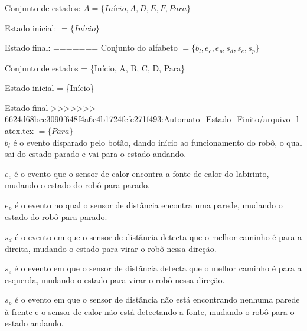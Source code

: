 \documentclass{report}
\begin{document}
Conjunto de estados:
$A = \{Início, A, D, E, F, Para\}$

Estado inicial:
$= \{Início\}$

Estado final:
=======
Conjunto do alfabeto
$= \{b_l, e_c, e_p, s_d, s_e, s_p\}$

Conjunto de estados
= \{Início, A, B, C, D, Para\}

Estado inicial
= \{Início\}

Estado final
>>>>>>> 6624d68bcc3090f648f4a6e4b1724fefc271f493:Automato_Estado_Finito/arquivo_latex.tex
$= \{Para\}$\\


$b_l$ é o evento disparado pelo botão, dando início ao funcionamento do robô, o qual sai do estado parado e vai para o estado andando.

$e_c$ é o evento que o sensor de calor encontra a fonte de calor do labirinto, mudando o estado do robô para parado.

$e_p$ é o evento no qual o sensor de distância encontra uma parede, mudando o estado do robô para parado.

$s_d$ é o evento em que o sensor de distância detecta que o melhor caminho é para a direita, mudando o estado para virar o robô nessa direção.

$s_e$ é o evento em que o sensor de distância detecta que o melhor caminho é para a esquerda, mudando o estado para virar o robô nessa direção.

$s_p$ é o evento em que o sensor de distância não está encontrando nenhuma parede à frente e o sensor de calor não está detectando a fonte, mudando o robô para o estado andando.
\end{document}
